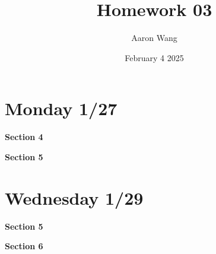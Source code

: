 \documentclass{article}
\title{Homework 03}
\author{Aaron Wang}
\date{February 4 2025}
\begin{document}
\maketitle
\section{Monday 1/27}
\begin{large}
 \textbf{Section 4}   
\end{large}
\begin{enumerate}
    
\end{enumerate}
\begin{large}
 \textbf{Section 5}   
\end{large}
\begin{enumerate}
    
    
    
    
    
    
\end{enumerate}
\section{Wednesday 1/29}
\begin{large}
 \textbf{Section 5}   
\end{large}
\begin{enumerate}
    
    
    
\end{enumerate}
\begin{large}
 \textbf{Section 6}   
\end{large}
\begin{enumerate}
    
\newpage
    
\end{enumerate}
\end{document}
